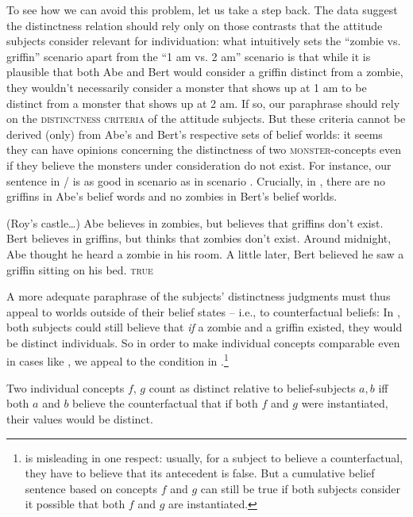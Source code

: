 \documentclass[output=paper]{langscibook}
\begin{document}
To see how we can avoid this problem, let us take a step back.  The data  suggest the distinctness relation should rely only on those contrasts that the attitude subjects consider relevant for individuation: what intuitively sets the ``zombie vs. griffin'' scenario apart from the ``1 am vs. 2 am'' scenario is that while it is plausible that both Abe and Bert would consider a griffin distinct from a zombie, they wouldn't necessarily consider a monster that shows up at 1 am to be distinct from a monster that shows up at 2 am. If so, our paraphrase should rely on the \textsc{distinctness criteria} of the attitude subjects. But these criteria cannot be derived (only) from Abe's and Bert's respective sets of belief worlds: it seems they can have opinions concerning the distinctness of two \textsc{monster}-concepts even if they believe the monsters under consideration do not exist. For instance, our sentence in / is as good in scenario  as in scenario . Crucially, in  , there are no griffins in Abe's belief words and no zombies in Bert's belief worlds.

\eanoraggedright \label{sch-has:ex:36c} (Roy's castle\ldots) Abe believes in zombies, but believes that griffins don't exist. Bert believes  in griffins, but thinks that zombies don't exist. Around midnight, Abe thought he heard a zombie in his room. A little later, Bert believed he saw a griffin sitting on his bed. \hfill {} \textsc{true}  \z

\noindent A more adequate paraphrase of the subjects' distinctness judgments must thus appeal to worlds outside of their belief states -- i.e., to counterfactual beliefs: In , both subjects could still believe that \textit{if} a zombie and a griffin existed, they would be distinct individuals. So in order to make individual concepts comparable even in cases like  ,  we appeal to the condition in .\footnote{ is misleading in one respect: usually, for a subject to believe a counterfactual, they have to believe that its antecedent is false. But a cumulative belief sentence based on concepts $f$ and $g$ can still be true if both subjects consider it possible that both $f$ and $g$ are instantiated.}

\eanoraggedright \label{sch-has:ex:37}  Two individual concepts $f$, $g$ count as distinct relative to belief-subjects $a,b$ iff  both $a$ and $b$ believe the counterfactual that if both $f$ and $g$ were instantiated, their values would be distinct.\z
\end{document}
